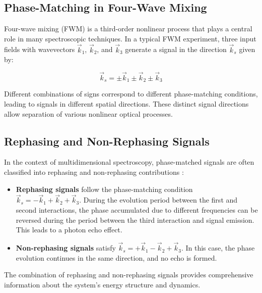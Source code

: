 \subsection{Phase-Matching in Four-Wave Mixing}
\label{subsec:fwm_phase_matching}

\noindent Four-wave mixing (FWM) is a third-order nonlinear process that plays a central role in many spectroscopic techniques. In a typical FWM experiment, three input fields with wavevectors $\vec{k}_1$, $\vec{k}_2$, and $\vec{k}_3$ generate a signal in the direction $\vec{k}_s$ given by:

\begin{equation}
    \vec{k}_s = \pm\vec{k}_1 \pm\vec{k}_2 \pm\vec{k}_3
    \label{eq:fwm_phase_matching}
\end{equation}

\noindent Different combinations of signs correspond to different phase-matching conditions, leading to signals in different spatial directions. These distinct signal directions allow separation of various nonlinear optical processes.

\subsection{Rephasing and Non-Rephasing Signals}
\label{subsec:rephasing_nonrephasing}

\noindent In the context of multidimensional spectroscopy, phase-matched signals are often classified into rephasing and non-rephasing contributions \cite{Cho2009TwodimensionalOpticalSpectroscopy, Jonas2003TwodimensionalFemtosecondSpectroscopy}:

\begin{itemize}
    \item \textbf{Rephasing signals} follow the phase-matching condition $\vec{k}_s = -\vec{k}_1 + \vec{k}_2 + \vec{k}_3$. During the evolution period between the first and second interactions, the phase accumulated due to different frequencies can be reversed during the period between the third interaction and signal emission. This leads to a photon echo effect.

    \item \textbf{Non-rephasing signals} satisfy $\vec{k}_s = +\vec{k}_1 - \vec{k}_2 + \vec{k}_3$. In this case, the phase evolution continues in the same direction, and no echo is formed.
\end{itemize}

\noindent The combination of rephasing and non-rephasing signals provides comprehensive information about the system's energy structure and dynamics.

